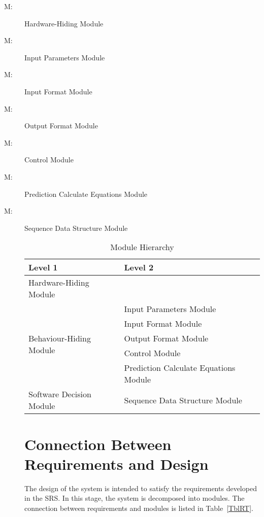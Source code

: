 \documentclass[12pt, titlepage]{article}
\newcounter{mnum}
\newcommand{\mthemnum}{M\themnum}
\begin{document}
\begin{description}
\item [ \mthemnum \label{mHH}:] Hardware-Hiding Module
\item [ \mthemnum \label{mIP}:] Input Parameters Module
\item [ \mthemnum \label{mIF}:] Input Format Module
\item [ \mthemnum \label{mOF}:] Output Format Module
\item [ \mthemnum \label{mC}:] Control Module
\item [ \mthemnum \label{mPCE}:] Prediction Calculate Equations Module
\item [ \mthemnum \label{mDS}:] Sequence Data Structure Module

\begin{table}[h!]
\centering
\begin{tabular}{p{} p{}}
\toprule
\textbf{Level 1} & \textbf{Level 2}\\
\midrule

{Hardware-Hiding Module} & ~ \\
\midrule

\multirow{5}{0.3\textwidth}{Behaviour-Hiding Module} 
& Input Parameters Module\\
& Input Format Module\\
& Output Format Module\\
& Control Module\\
& Prediction Calculate Equations Module\\
\midrule

\multirow{1}{0.3\textwidth}{Software Decision Module} 
& Sequence Data Structure Module\\
\bottomrule

\end{tabular}
\caption{Module Hierarchy}
\label{TblMH}
\end{table}

\section{Connection Between Requirements and Design} \label{SecConnection}

The design of the system is intended to satisfy the requirements developed in
the SRS. In this stage, the system is decomposed into modules. The connection
between requirements and modules is listed in Table~\ref{TblRT}.


\end{description}
\end{document}
